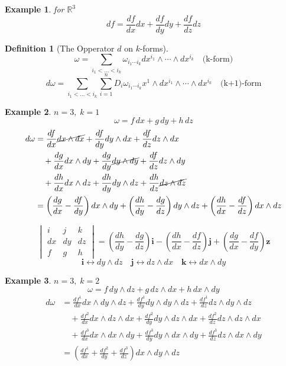 \documentclass[12pt]{article}
\def\RR{\mathbb{R}}
\newtheorem{definition}{Definition}[section]
\newtheorem{example}{Example}[section]
\begin{document}
\begin{example}
for $\RR^3$
\[ df = \frac{df}{dx}dx + \frac{df}{dy}dy + \frac{df}{dz}dz \]
\end{example}

\begin{definition}[The Opperator $d$ on $k$-forms]
\[\omega = \sum\limits_{i_1<\dots <i_k}\omega_{i_1\cdots i_k}dx^{i_1}\wedge\cdots\wedge dx^{i_k}\quad \text{(k-form)}\]
\[d\omega = \sum\limits_{i_1<\dots <i_k}\sum\limits_{i=1}^nD_i\omega_{i_1\cdots i_k}x^1\wedge dx^{i_1}\wedge\cdots\wedge dx^{i_k}\quad \text{(k+1)-form}\]
\end{definition}

\begin{example}
$n=3, \; k=1$
\[\omega  = f\,dx + g\,dy + h\,dz\]
\begin{align*}
d\omega &= \frac{df}{dx}\cancel{dx\wedge dx} + \frac{df}{dy}dy\wedge dx + \frac{df}{dz}dz\wedge dx\\
& \quad + \frac{dg}{dx}dx\wedge dy + \frac{dg}{dy}\cancel{dy\wedge dy} + \frac{df}{dz}dz\wedge dy\\
& \quad + \frac{dh}{dx}dx\wedge dz + \frac{dh}{dy}dy\wedge dz + \frac{dh}{dz}\cancel{dz\wedge dz} \\
&=  \left(\frac{dg}{dx} - \frac{df}{dy} \right) dx\wedge dy + \left(\frac{dh}{dy} - \frac{dg}{dz} \right) dy\wedge dz +\left(\frac{dh}{dx} - \frac{df}{dz} \right) dx\wedge dz  
\end{align*}

\[\begin{vmatrix} i & j & k\\ dx &dy &dz \\ f &g &h \end{vmatrix} =  \left(\frac{dh}{dy} - \frac{dg}{dz} \right)\mathbf{i}  - \left(\frac{dh}{dx} - \frac{df}{dz} \right) \mathbf{j} +  \left(\frac{dg}{dx} - \frac{df}{dy} \right) \mathbf{z} \]
\[\mathbf{i} \leftrightarrow dy\wedge dz \quad \mathbf{j} \leftrightarrow dz \wedge dx \quad \mathbf{k} \leftrightarrow dx \wedge dy\]
\end{example}

\begin{example}
$n=3, \; k=2$
\[\omega  = f \,dy \wedge dz + g\, dz \wedge  dx  + h \,dx \wedge dy\]
\begin{align*} d\omega &= \frac{df^1}{dx}dx\wedge dy \wedge dz + \frac{df^1}{dy}dy\wedge dy \wedge dz + \frac{df^1}{dz}dz\wedge dy \wedge dz\\
& \quad +\frac{df^2}{dx}dx\wedge dz \wedge dx + \frac{df^2}{dy}dy\wedge dz \wedge dx + \frac{df^2}{dz}dz\wedge dz\wedge dx\\
& \quad + \frac{df^3}{dx}dx\wedge dx \wedge dy + \frac{df^3}{dy}dy\wedge dx \wedge dy + \frac{df^3}{dz}dz\wedge dx \wedge dy\\
&= \left( \frac{df^1}{dx} + \frac{df^2}{dy} + \frac{df^3}{dz} \right)dx\wedge dy \wedge dz
\end{align*}
\end{example}
\end{document}
